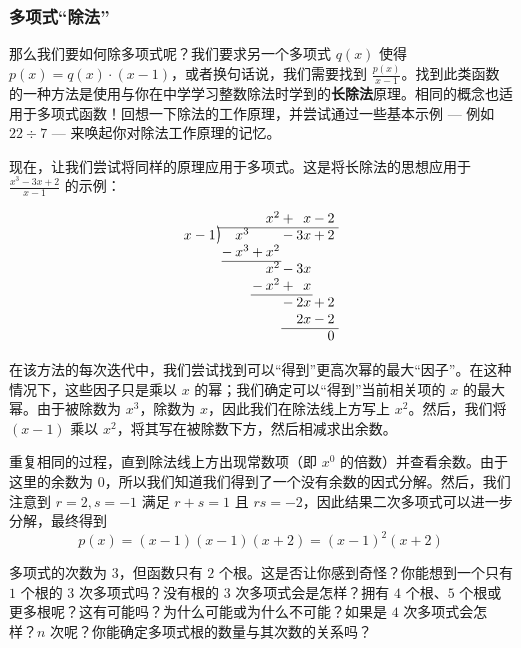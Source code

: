 \subsubsection*{多项式“除法”}

那么我们要如何除多项式呢？我们要求另一个多项式 $q(x)$ 使得 $p(x) = q(x) \cdot (x - 1)$，或者换句话说，我们需要找到 $\frac{p(x)}{x-1}$。找到此类函数的一种方法是使用与你在中学学习整数除法时学到的\textbf{长除法}原理。相同的概念也适用于多项式函数！回想一下除法的工作原理，并尝试通过一些基本示例 --- 例如 $22 \div 7$ --- 来唤起你对除法工作原理的记忆。

现在，让我们尝试将同样的原理应用于多项式。这是将长除法的思想应用于 $\frac{x^3-3x+2}{x-1}$ 的示例：

\[
\arraycolsep=1pt
\begin{array}{*1r @{\hskip\arraycolsep}c@{\hskip\arraycolsep} *{9}r}
        &          &   &      &   & x^2 & + &  x & - & 2 &  \\
\cline{2-11}
x-1     & \longdiv &   & x^3  &   &  & -    & 3x & + & 2 &  \\
        &          & - & x^3  & + & x^2 &   &    &   &   &  \\
\cline{3-6}
        &          &   &      &   & x^2 & - & 3x &   &   &  \\
        &          &   &      & - & x^2 & + &  x &   &   &  \\
\cline{5-8}
        &          &   &      &   &     & - & 2x & + & 2 &  \\
        &          &   &      &   &     &   & 2x & - & 2 &  \\
\cline{7-11}
        &          &   &      &   &     &   &    &   & 0 &  \\
\end{array}
\]

在该方法的每次迭代中，我们尝试找到可以“得到”更高次幂的最大“因子”。在这种情况下，这些因子只是乘以 $x$ 的幂；我们确定可以“得到”当前相关项的 $x$ 的最大幂。由于被除数为 $x^3$，除数为 $x$，因此我们在除法线上方写上 $x^2$。然后，我们将 $(x-1)$ 乘以 $x^2$，将其写在被除数下方，然后相减求出余数。

重复相同的过程，直到除法线上方出现常数项（即 $x^0$ 的倍数）并查看余数。由于这里的余数为 $0$，所以我们知道我们得到了一个没有余数的因式分解。然后，我们注意到 $r=2, s=-1$ 满足 $r+s=1$ 且 $rs=-2$，因此结果二次多项式可以进一步分解，最终得到
\[p(x) = (x - 1)(x - 1)(x + 2) = (x - 1)^2(x + 2)\]

多项式的次数为 $3$，但函数只有 $2$ 个根。这是否让你感到奇怪？你能想到一个只有 $1$ 个根的 $3$ 次多项式吗？没有根的 $3$ 次多项式会是怎样？拥有 $4$ 个根、$5$ 个根或更多根呢？这有可能吗？为什么可能或为什么不可能？如果是 $4$ 次多项式会怎样？$n$ 次呢？你能确定多项式根的数量与其次数的关系吗？

